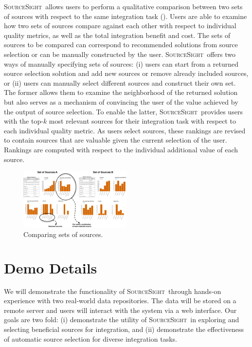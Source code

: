 \documentclass{vldb}
\newcommand\system{\textsc{SourceSight}}
\begin{document}
\system~allows users to perform a qualitative comparison between two sets of sources with respect to the same integration task (). Users are able to examine how two sets of sources compare against each other with respect to individual quality metrics, as well as the total integration benefit and cost. The sets of sources to be compared can correspond to recommended solutions from source selection or can be manually constructed by the user. \system~offers two ways of manually specifying sets of sources: (i) users can start from a returned source selection solution and add new sources or remove already included sources, or (ii) users can manually select different sources and construct their own set. The former allows them to examine the neighborhood of the returned solution but also serves as a mechanism of convincing the user of the value achieved by the output of source selection. To enable the latter, \system~provides users with the top-$k$ most relevant sources for their integration task with respect to each individual quality metric. As users select sources, these rankings are revised to contain sources that are valuable given the current selection of the user. Rankings are computed with respect to the individual additional value of each source. 
\begin{figure}
	\begin{center}
	\includegraphics[trim=0 0 0 0, clip,width=0.5\textwidth]{fig/compSS}
	\vspace{-20pt}
	\caption{Comparing sets of sources.}
	\label{fig:comparison}
	\vspace{-25pt}
	\end{center}
\end{figure}

\vspace{-5pt}
\section{Demo Details}
\label{sec:details}
We will demonstrate the functionality of \system~through hands-on experience with two real-world data repositories. The data will be stored on a remote server and users will interact with the system via a web interface. Our goals are two fold: (i) demonstrate the utility of \system~in exploring and selecting beneficial sources for integration, and (ii) demonstrate the effectiveness of automatic source selection for diverse integration tasks. 
\end{document}
